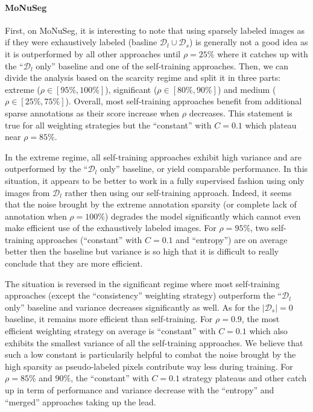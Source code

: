 \paragraph{MoNuSeg} First, on MoNuSeg, it is interesting to note that using sparsely labeled images as if they were exhaustively labeled (\ie basline $\mathcal{D}_l \cup \mathcal{D}_s$) is generally not a good idea as it is outperformed by all other approaches until $\rho = 25\%$ where it catches up with the ``$\mathcal{D}_l$ only'' baseline and one of the self-training approaches. Then, we can divide the analysis based on the scarcity regime and split it in three parts: extreme ($\rho \in [95\%, 100\%]$), significant ($\rho \in [80\%, 90\%]$) and medium ($\rho \in [25\%, 75\%]$). Overall, most self-training approaches benefit from additional sparse annotations as their score increase when $\rho$ decreases. This statement is true for all weighting strategies but the ``constant'' with $C = 0.1$ which plateau near $\rho = 85\%$. 

In the extreme regime, all self-training approaches exhibit high variance and are outperformed by the ``$\mathcal{D}_l$ only'' baseline, or yield comparable performance. In this situation, it appears to be better to work in a fully supervised fashion using only images from $\mathcal{D}_l$ rather then using our self-training approach. Indeed, it seems that the noise brought by the extreme annotation sparsity (or complete lack of annotation when $\rho = 100\%$) degrades the model significantly which cannot even make efficient use of the exhaustively labeled images. For $\rho = 95\%$, two self-training approaches (``constant'' with $C = 0.1$ and ``entropy'') are on average better then the baseline but variance is so high that it is difficult to really conclude that they are more efficient. 

The situation is reversed in the significant regime where most self-training approaches (except the ``consistency'' weighting strategy) outperform the ``$\mathcal{D}_l$ only'' baseline and variance decreases significantly as well. As for the $|\mathcal{D}_s| = 0$ baseline, it remains more efficient than self-training. For $\rho = 0.9$, the most efficient weighting strategy on average is ``constant'' with $C = 0.1$ which also exhibits the smallest variance of all the self-training approaches. We believe that such a low constant is particularily helpful to combat the noise brought by the high sparsity as pseudo-labeled pixels contribute way less during training. For $\rho = 85\%$ and $90\%$, the ``constant'' with $C = 0.1$ strategy plateaus and other catch up in term of performance and variance decrease with the ``entropy'' and ``merged'' approaches taking up the lead.

